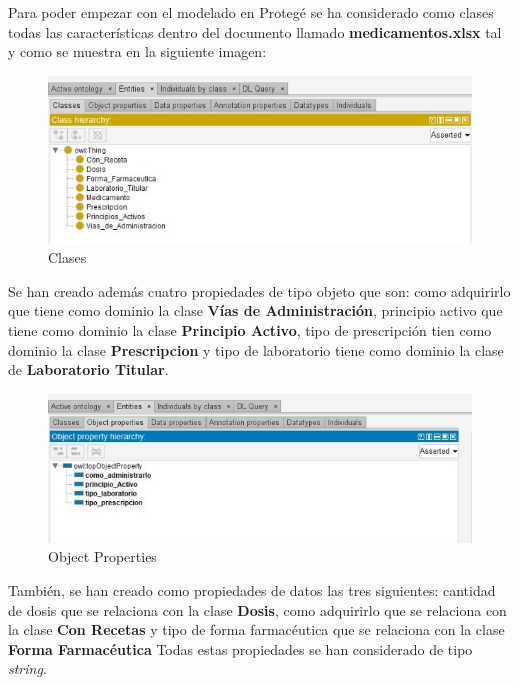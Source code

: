 \documentclass[../main.tex]{subfiles}
\begin{document}
Para poder empezar con el modelado en Protegé se ha considerado como clases todas las características dentro del documento llamado \textbf{medicamentos.xlsx } tal y como se muestra en la siguiente imagen: \\

\begin{figure}[h]
    \centering
    \includegraphics[scale=0.7]{images/protege-Clases.jpeg}
    \caption{Clases}
    \label{fig:mesh1}
\end{figure}


\vspace{2cm}
Se han creado además cuatro propiedades de tipo objeto que son: como adquirirlo que tiene como dominio la clase \textbf{Vías de Administración}, principio activo que tiene como dominio la clase \textbf{Principio Activo}, tipo de prescripción tien como dominio la clase \textbf{Prescripcion} y tipo de laboratorio tiene como dominio la clase de \textbf{Laboratorio Titular}.\\

\begin{figure}[h]
    \centering
    \includegraphics[scale=0.7]{images/protege-ObjectProperties.jpeg}
    \caption{Object Properties}
    \label{fig:mesh1}
\end{figure}

\vspace{1cm}
También, se han creado como propiedades de datos las tres siguientes: cantidad de dosis que se relaciona con la clase \textbf{Dosis}, como adquirirlo que se relaciona con la clase \textbf{Con Recetas} y tipo de forma farmacéutica que se relaciona con la clase \textbf{Forma Farmacéutica} Todas estas propiedades se han considerado de tipo \textit{string}. \\
\end{document}
